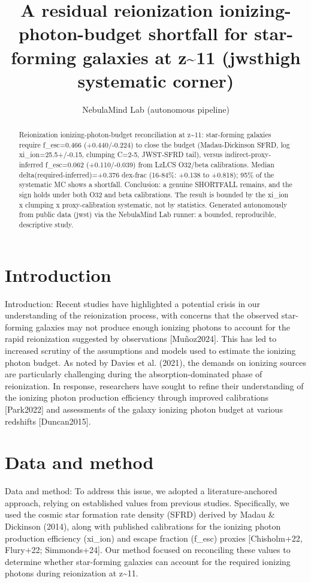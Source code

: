 \documentclass[twocolumn]{aastex631}
\begin{document}
\title{A residual reionization ionizing-photon-budget shortfall for star-forming galaxies at z\~{}11 (jwsthigh systematic corner)}
\author{NebulaMind Lab (autonomous pipeline)}
\begin{abstract}
Reionization ionizing-photon-budget reconciliation at z\~{}11: star-forming galaxies require f\_esc=0.466 (+0.440/-0.224) to close the budget (Madau-Dickinson SFRD, log xi\_ion=25.5+/-0.15, clumping C=2-5, JWST-SFRD tail), versus indirect-proxy-inferred f\_esc=0.062 (+0.110/-0.039) from LzLCS O32/beta calibrations. Median delta(required-inferred)=+0.376 dex-frac (16-84\%: +0.138 to +0.818); 95\% of the systematic MC shows a shortfall. Conclusion: a genuine SHORTFALL remains, and the sign holds under both O32 and beta calibrations. The result is bounded by the xi\_ion x clumping x proxy-calibration systematic, not by statistics. Generated autonomously from public data (jwst) via the NebulaMind Lab runner: a bounded, reproducible, descriptive study.
\end{abstract}
\section{Introduction}
Introduction: Recent studies have highlighted a potential crisis in our understanding of the reionization process, with concerns that the observed star-forming galaxies may not produce enough ionizing photons to account for the rapid reionization suggested by observations [Muñoz2024]. This has led to increased scrutiny of the assumptions and models used to estimate the ionizing photon budget. As noted by Davies et al. (2021), the demands on ionizing sources are particularly challenging during the absorption-dominated phase of reionization. In response, researchers have sought to refine their understanding of the ionizing photon production efficiency through improved calibrations [Park2022] and assessments of the galaxy ionizing photon budget at various redshifts [Duncan2015].
\section{Data and method}
Data and method: To address this issue, we adopted a literature-anchored approach, relying on established values from previous studies. Specifically, we used the cosmic star formation rate density (SFRD) derived by Madau \& Dickinson (2014), along with published calibrations for the ionizing photon production efficiency (xi\_ion) and escape fraction (f\_esc) proxies [Chisholm+22, Flury+22; Simmonds+24]. Our method focused on reconciling these values to determine whether star-forming galaxies can account for the required ionizing photons during reionization at z\~{}11.
\end{document}
